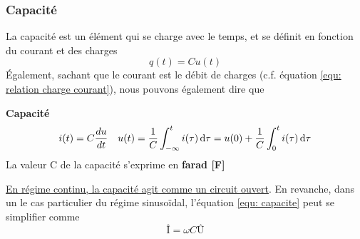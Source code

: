 \documentclass[12pt,a4paper]{article}
\newcommand{\I}{\text{Î} }
\newcommand{\U}{\text{Û} }
\begin{document}
\subsubsection{Capacité}
\label{subsubsection: capacite}
La capacité est un élément qui se charge avec le temps, et se définit en fonction du courant et des charges
\begin{equation}
	q(t) = C u(t)
\end{equation}
Également, sachant que le courant est le débit de charges (c.f. équation \ref{equ: relation charge courant}), nous pouvons également dire que
\begin{boite}
	\textbf{Capacité}
	\begin{equation}
		i(t) = C \frac{d{u}}{d{t}} \quad u(t) = \frac{1}{C}\int_{-\infty}^t i(\tau)\, \mathrm d \tau = u(0) + \frac{1}{C}\int_0^t i(\tau)\, \mathrm d \tau
		\label{equ: capacite}
	\end{equation}	
	La valeur C de la capacité s'exprime en \textbf{farad [F]}
\end{boite}
\uline{En régime continu, la capacité agit comme un circuit ouvert}. En revanche, dans un le cas particulier du régime sinusoïdal, l'équation \ref{equ: capacite} peut se simplifier comme
\begin{equation}
	\I = \omega C \U
\end{equation}

\end{document}
